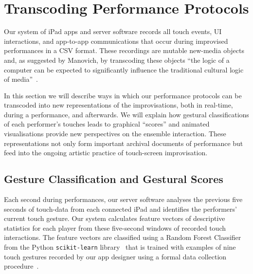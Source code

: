 \documentclass[graybox]{svmult}
\begin{document}
\section{Transcoding Performance Protocols}
\label{sec:analysis}

Our system of iPad apps and server software records all touch events,
UI interactions, and app-to-app communications that occur during
improvised performances in a CSV format. These
recordings are mutable new-media objects and, as suggested by Manovich,
by transcoding these objects ``the logic of a computer can be expected
to significantly influence the traditional cultural logic of
media''~\cite{Manovich:2002ly}.

In this section we will describe ways in which our performance
protocols can be transcoded into new representations of the
improvisations, both in real-time, during a performance, and
afterwards. We will explain how gestural classifications of each
performer's touches leads to graphical ``scores'' and animated
visualisations provide new perspectives on the ensemble interaction.
These representations not only form important archival documents of
performance but feed into the ongoing artistic practice of
touch-screen improvisation.

\subsection{Gesture Classification and Gestural Scores}
\label{subsec:gesture-classification}

Each second during performances, our server software analyses the
previous five seconds of touch-data from each connected iPad and
identifies the performers' current touch gesture. Our system
calculates feature vectors of descriptive statistics for each player
from these five-second windows of recorded touch interactions. The
feature vectors are classified using a Random Forest
Classifier~\cite{Breiman:2001kx} from the Python \texttt{scikit-learn}
library~\cite{scikit-learn} that is trained with examples of nine touch gestures recorded
by our app designer using a formal data collection
procedure~\cite{Martin:2015jk}. 
\end{document}
